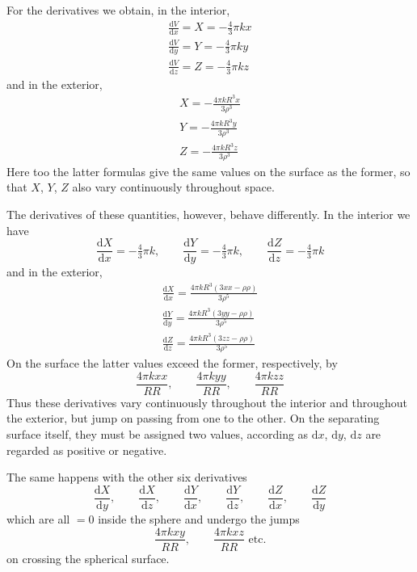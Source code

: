 For the derivatives we obtain, in the interior,
\[
\begin{array}{l}
\displaystyle\frac{\mathrm{d}V}{\mathrm{d}x}=X=-\tfrac{4}{3}\pi kx\\[6pt]
\displaystyle\frac{\mathrm{d}V}{\mathrm{d}y}=Y=-\tfrac{4}{3}\pi ky\\[6pt]
\displaystyle\frac{\mathrm{d}V}{\mathrm{d}z}=Z=-\tfrac{4}{3}\pi kz
\end{array}
\]
and in the exterior,
\[
\begin{array}{l}
\displaystyle X=-\frac{4\pi kR^3x}{3\rho^3}\\[6pt]
\displaystyle Y=-\frac{4\pi kR^3y}{3\rho^3}\\[6pt]
\displaystyle Z=-\frac{4\pi kR^3z}{3\rho^3}
\end{array}
\]
Here too the latter formulas give the same values on the surface as the former, so that $X$, $Y$, $Z$ also vary continuously throughout space.

The derivatives of these quantities, however, behave differently. In the interior we have
\[
\frac{\mathrm{d}X}{\mathrm{d}x}=-\tfrac{4}{3}\pi k,\qquad \frac{\mathrm{d}Y}{\mathrm{d}y}=-\tfrac{4}{3}\pi k,\qquad \frac{\mathrm{d}Z}{\mathrm{d}z}=-\tfrac{4}{3}\pi k
\]
and in the exterior,
\[
\begin{array}{l}
\displaystyle\frac{\mathrm{d}X}{\mathrm{d}x}=\frac{4\pi kR^3(3xx-\rho\rho)}{3\rho^5}\\[6pt]
\displaystyle\frac{\mathrm{d}Y}{\mathrm{d}y}=\frac{4\pi kR^3(3yy-\rho\rho)}{3\rho^5}\\[6pt]
\displaystyle\frac{\mathrm{d}Z}{\mathrm{d}z}=\frac{4\pi kR^3(3zz-\rho\rho)}{3\rho^5}
\end{array}
\]
On the surface the latter values exceed the former, respectively, by
\[
\frac{4\pi kxx}{RR},\qquad \frac{4\pi kyy}{RR},\qquad \frac{4\pi kzz}{RR}
\]
Thus these derivatives vary continuously throughout the interior and throughout the exterior, but jump on passing from one to the other. On the separating surface itself, they must be assigned two values, according as $\mathrm{d}x$, $\mathrm{d}y$, $\mathrm{d}z$ are regarded as positive or negative.

The same happens with the other six derivatives
\[
\frac{\mathrm{d}X}{\mathrm{d}y},\qquad \frac{\mathrm{d}X}{\mathrm{d}z},\qquad \frac{\mathrm{d}Y}{\mathrm{d}x},\qquad \frac{\mathrm{d}Y}{\mathrm{d}z},\qquad \frac{\mathrm{d}Z}{\mathrm{d}x},\qquad \frac{\mathrm{d}Z}{\mathrm{d}y}
\]
which are all $=0$ inside the sphere and undergo the jumps
\[
\frac{4\pi kxy}{RR},\qquad \frac{4\pi kxz}{RR}\text{ etc.}
\]
on crossing the spherical surface.

